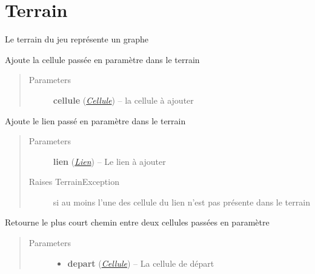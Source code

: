 \documentclass[letterpaper,10pt,english]{sphinxmanual}
\begin{document}
\chapter{Terrain}
\label{index:module-Terrain}\label{index:terrain}

\begin{fulllineitems}
\label{index:Terrain.Terrain}
Le terrain du jeu représente un graphe

\begin{fulllineitems}
\label{index:Terrain.Terrain.ajouterCellule}
Ajoute la cellule passée en paramètre dans le terrain
\begin{quote}\begin{description}
\item[{Parameters}] \leavevmode
\textbf{cellule} ({\hyperref[index:module-Cellule]{\emph{Cellule}}}) -- la cellule à ajouter

\end{description}\end{quote}

\end{fulllineitems}


\begin{fulllineitems}
\label{index:Terrain.Terrain.ajouterLien}
Ajoute le lien passé en paramètre dans le terrain
\begin{quote}\begin{description}
\item[{Parameters}] \leavevmode
\textbf{lien} ({\hyperref[index:module-Lien]{\emph{Lien}}}) -- Le lien à ajouter

\item[{Raises TerrainException}] \leavevmode
si au moins l'une des cellule du lien n'est pas présente dans le terrain

\end{description}\end{quote}

\end{fulllineitems}


\begin{fulllineitems}
\label{index:Terrain.Terrain.dijkstra}
Retourne le plus court chemin entre deux cellules passées en paramètre
\begin{quote}\begin{description}
\item[{Parameters}] \leavevmode\begin{itemize}
\item {} 
\textbf{depart} ({\hyperref[index:module-Cellule]{\emph{Cellule}}}) -- La cellule de départ


\end{itemize}
\end{description}
\end{quote}
\end{fulllineitems}
\end{fulllineitems}
\end{document}
